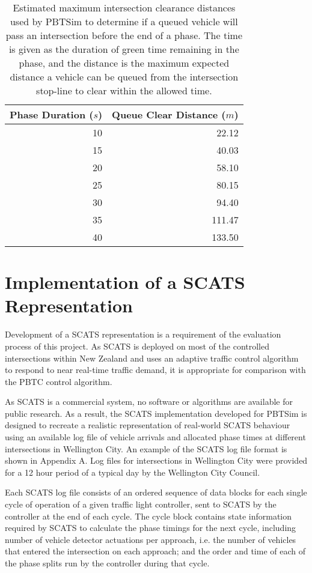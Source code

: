 \begin{table}[]
\begin{center}
\begin{tabular}{rr}
\toprule
Phase Duration ($s$) & Queue Clear Distance ($m$) \\
\midrule
10 & 22.12 \\
15 & 40.03 \\
20 & 58.10 \\
25 & 80.15 \\
30 & 94.40 \\
35 & 111.47 \\
40 & 133.50 \\
\bottomrule
\end{tabular}
\end{center}
\caption{ Estimated maximum intersection clearance distances used by PBTSim to determine if a queued vehicle will pass an intersection before the end of a phase. The time is given as the duration of green time remaining in the phase, and the distance is the maximum expected distance a vehicle can be queued from the intersection stop-line to clear within the allowed time. }
\label{vehiclecleardistances}
\end{table}

\section{Implementation of a SCATS Representation}

Development of a SCATS representation is a requirement of the evaluation process of this project. As SCATS is deployed on most of the controlled intersections within New Zealand and uses an adaptive traffic control algorithm to respond to near real-time traffic demand, it is appropriate for comparison with the PBTC control algorithm.

As SCATS is a commercial system, no software or algorithms are available for public research. As a result, the SCATS implementation developed for PBTSim is designed to recreate a realistic representation of real-world SCATS behaviour using an available log file of vehicle arrivals and allocated phase times at different intersections in Wellington City. An example of the SCATS log file format is shown in Appendix A. Log files for intersections in Wellington City were provided for a 12 hour period of a typical day by the Wellington City Council.

Each SCATS log file consists of an ordered sequence of data blocks for each single cycle of operation of a given traffic light controller, sent to SCATS by the controller at the end of each cycle. The cycle block contains state information required by SCATS to calculate the phase timings for the next cycle, including number of vehicle detector actuations per approach, i.e. the number of vehicles that entered the intersection on each approach; and the order and time of each of the phase splits run by the controller during that cycle. 

